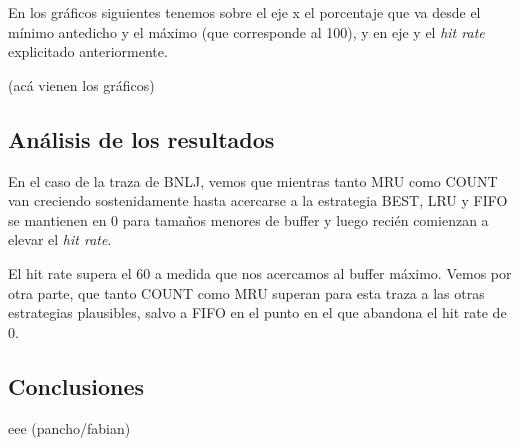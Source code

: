 En los gr\'aficos siguientes tenemos sobre el eje x el porcentaje que va desde el m\'inimo antedicho y el m\'aximo (que corresponde al 100), y en eje y el \textit{hit rate} explicitado anteriormente. 

(ac\'a vienen los gr\'aficos)
\subsection{An\'alisis de los resultados}
En el caso de la traza de BNLJ, vemos que mientras tanto MRU como COUNT van creciendo sostenidamente hasta acercarse a la estrategia BEST, LRU y FIFO se mantienen en 0 para tama\~nos menores de buffer y luego reci\'en comienzan a elevar el \textit{hit rate}.

El hit rate supera el 60 a medida que nos acercamos al buffer m\'aximo. Vemos por otra parte, que tanto COUNT como MRU superan para esta traza a las otras estrategias plausibles, salvo a FIFO en el punto en el que abandona el hit rate de 0.

\subsection{Conclusiones}
eee (pancho/fabian)
